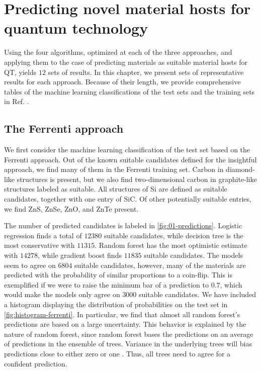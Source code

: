 \chapter{Predicting novel material hosts for quantum technology}

Using the four algorithms, optimized at each of the three approaches, and applying them to the case of predicting materials as suitable material hosts for QT, yields $12$ sets of results. In this chapter, we present sets of representative results for each approach. Because of their length, we provide comprehensive tables of the machine learning classifications of the test sets and the training sets in Ref. \cite{Ohebbi2021}.

\section{The Ferrenti approach}

We first consider the machine learning classification of the test set based on the Ferrenti approach. Out of the known suitable candidates defined for the insightful approach, we find many of them in the Ferrenti training set. Carbon in diamond-like structures is present, but we also find two-dimensional carbon in graphite-like structures labeled as suitable. All structures of Si are defined as suitable candidates, together with one entry of SiC. Of other potentially suitable entries, we find ZnS, ZnSe, ZnO, and ZnTe present.



The number of predicted candidates is labeled in \autoref{fig:01-predictions}. Logistic regression finds a total of $12380$ suitable candidates, while decision tree is the most conservative with $11315$. Random forest has the most optimistic estimate with $14278$, while gradient boost finds $11835$ suitable candidates. The models seem to agree on $6804$ suitable candidates, however, many of the materials are predicted with the probability of similar proportions to a coin-flip. This is exemplified if we were to raise the minimum bar of a prediction to $0.7$, which would make the models only agree on $3000$ suitable candidates. We have included a histogram displaying the distribution of probabilities on the test set in \autoref{fig:histogram-ferrenti}.
In particular, we find that almost all random forest's predictions are based on a large uncertainty. This behavior is explained by the nature of random forest, since random forest bases the predictions on an average of predictions in the ensemble of trees. Variance in the underlying trees will bias predictions close to either zero or one \cite{NiculescuMizil2005}. Thus, all trees need to agree for a confident prediction.

